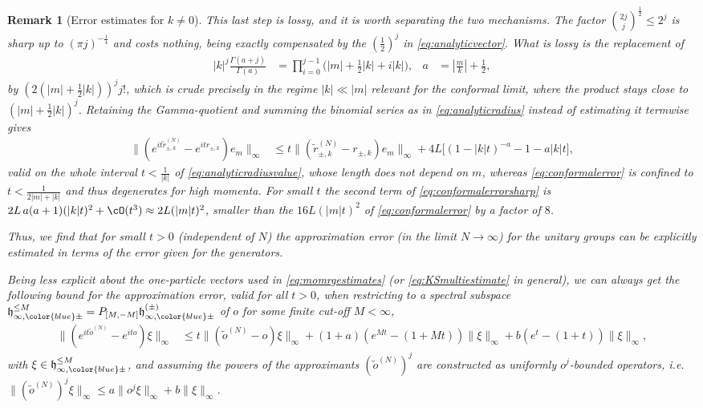 \documentclass[a4paper, 11pt]{article}
\newcommand{\fh}{\mathfrak{h}}
\DeclareMathOperator{\1}{\mathds{1}}
\newtheorem{rem}[thm]{Remark}
\begin{document}
\begin{rem}[Error estimates for $k\neq0$]
This last step is lossy, and it is worth separating the two mechanisms. The factor $\binom{2j}{j}^{\frac{1}{2}}\leq2^{j}$ is sharp up to $(\pi j)^{-\frac{1}{4}}$ and costs nothing, being exactly compensated by the $(\tfrac{1}{2})^{j}$ in \eqref{eq:analyticvector}. What is lossy is the replacement of
\begin{align*}
|k|^{j}\tfrac{\Gamma(a+j)}{\Gamma(a)} & = \prod_{i=0}^{j-1}\big(|m|+\tfrac{1}{2}|k|+i|k|\big), & a & = |\tfrac{m}{k}|+\tfrac{1}{2},
\end{align*}
by $(2(|m|+\tfrac{1}{2}|k|))^{j}j!$, which is crude precisely in the regime $|k|\ll|m|$ relevant for the conformal limit, where the product stays close to $(|m|+\tfrac{1}{2}|k|)^{j}$. Retaining the Gamma-quotient and summing the binomial series as in \eqref{eq:analyticradius} instead of estimating it termwise gives
\begin{align}
\label{eq:conformalerrorsharp}
\|(e^{it\tilde{r}^{(N)}_{\pm,k}}-e^{itr_{\pm,k}})e_{m}\|_{\infty} & \leq t\|(\tilde{r}^{(N)}_{\pm,k}-r_{\pm,k})e_{m}\|_{\infty}+4L\big[(1-|k|t)^{-a}-1-a|k|t\big],
\end{align}
valid on the whole interval $t<\tfrac{1}{|k|}$ of \eqref{eq:analyticradiusvalue}, whose length does not depend on $m$, whereas \eqref{eq:conformalerror} is confined to $t<\tfrac{1}{2|m|+|k|}$ and thus degenerates for high momenta. For small $t$ the second term of \eqref{eq:conformalerrorsharp} is $2L\!\ a(a+1)(|k|t)^{2}+\cO(t^{3})\approx2L(|m|t)^{2}$, smaller than the $16L(|m|t)^{2}$ of \eqref{eq:conformalerror} by a factor of $8$.

\medskip

Thus, we find that for small $t>0$ (independent of $N$) the approximation error (in the limit $N\rightarrow\infty$) for the unitary groups can be explicitly estimated in terms of the error given for the generators.

\medskip

Being less explicit about the one-particle vectors used in \eqref{eq:momrgestimates} (or \eqref{eq:KSmultiestimate} in general), we can always get the following bound for the approximation error, valid for all $t>0$, when restricting to a spectral subspace $\fh_{\infty,{\color{blue}\pm}}^{\leq M} = P_{[M,-M]}\fh^{(\pm)}_{\infty,{\color{blue}\pm}}$ of $o$ for some finite cut-off $M<\infty$, 
\begin{align*}
\|(e^{it\tilde{o}^{(N)}}\!-\!e^{ito})\xi\|_{\infty} & \!\leq\! t \|(\tilde{o}^{(N)}\!-\!o)\xi\|_{\infty}\!+\!(1\!+\!a)(e^{M t}\!-\!(1\!+\!M t))\|\xi\|_{\infty}\!+\!b(e^{t}\!-\!(1\!+\!t))\|\xi\|_{\infty},
\end{align*}
with $\xi\in\fh_{\infty,{\color{blue}\pm}}^{\leq M}$, and assuming the powers of the approximants $(\tilde{o}^{(N)})^{j}$ are constructed as uniformly $o^{j}$-bounded operators, i.e.~$\|(\tilde{o}^{(N)})^{j}\xi\|_{\infty}\leq a\|o^{j}\xi\|_{\infty}+b\|\xi\|_{\infty}$.
\end{rem}
\end{document}
